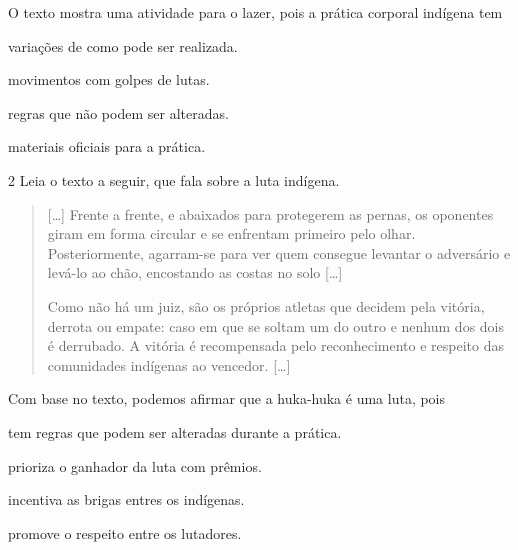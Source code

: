 \noindent{}O texto mostra uma atividade para o lazer, pois a prática corporal indígena tem

\begin{minipage}{.5\textwidth}
\begin{escolha}
\item variações de como pode ser realizada.

\item movimentos com golpes de lutas.

\item regras que não podem ser alteradas.

\item materiais oficiais para a prática.
\end{escolha}
\end{minipage}



\num{2} Leia o texto a seguir, que fala sobre a luta indígena.

\begin{quote}

{[}\ldots{}{]} Frente a frente, e abaixados para protegerem as pernas, os oponentes
giram em forma circular e se enfrentam primeiro pelo olhar.
Posteriormente, agarram-se para ver quem consegue levantar o adversário
e levá-lo ao chão, encostando as costas no solo {[}\ldots{}{]}

Como não há um juiz, são os próprios atletas que decidem pela vitória,
derrota ou empate: caso em que se soltam um do outro e nenhum dos dois é
derrubado. A vitória é recompensada pelo reconhecimento e respeito das
comunidades indígenas ao vencedor. {[}\ldots{}{]}

\end{quote}

\noindent{}Com base no texto, podemos afirmar que a huka-huka é uma luta, pois

\begin{escolha}
\item tem regras que podem ser alteradas durante a prática.

\item prioriza o ganhador da luta com prêmios.

\item incentiva as brigas entres os indígenas.

\item promove o respeito entre os lutadores.
\end{escolha}



